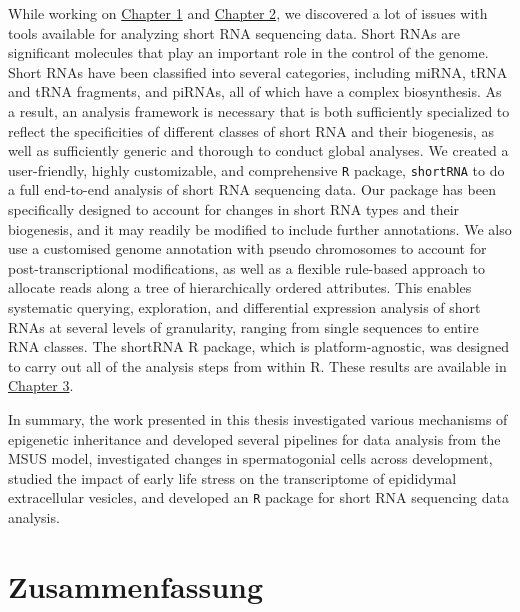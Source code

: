 \documentclass[12pt,twoside]{reedthesis}
\begin{document}
While working on \protect\hyperlink{chapter1}{Chapter 1} and \protect\hyperlink{chapter2}{Chapter 2}, we discovered a lot of issues with tools available for analyzing short RNA sequencing data. Short RNAs are significant molecules that play an important role in the control of the genome. Short RNAs have been classified into several categories, including miRNA, tRNA and tRNA fragments, and piRNAs, all of which have a complex biosynthesis. As a result, an analysis framework is necessary that is both sufficiently specialized to reflect the specificities of different classes of short RNA and their biogenesis, as well as sufficiently generic and thorough to conduct global analyses. We created a user-friendly, highly customizable, and comprehensive \texttt{R} package, \texttt{shortRNA} to do a full end-to-end analysis of short RNA sequencing data. Our package has been specifically designed to account for changes in short RNA types and their biogenesis, and it may readily be modified to include further annotations. We also use a customised genome annotation with pseudo chromosomes to account for post-transcriptional modifications, as well as a flexible rule-based approach to allocate reads along a tree of hierarchically ordered attributes. This enables systematic querying, exploration, and differential expression analysis of short RNAs at several levels of granularity, ranging from single sequences to entire RNA classes. The shortRNA R package, which is platform-agnostic, was designed to carry out all of the analysis steps from within R. These results are available in \protect\hyperlink{chapter3}{Chapter 3}.

In summary, the work presented in this thesis investigated various mechanisms of epigenetic inheritance and developed several pipelines for data analysis from the MSUS model, investigated changes in spermatogonial cells across development, studied the impact of early life stress on the transcriptome of epididymal extracellular vesicles, and developed an \texttt{R} package for short RNA sequencing data analysis.

\hypertarget{summary-de}{%
\chapter*{Zusammenfassung}\label{summary-de}}
\end{document}
